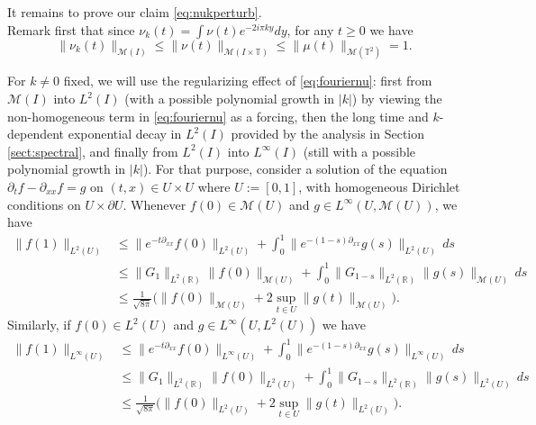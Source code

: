\documentclass[12pt]{article}
\newcommand{\R}{\mathbb{R}}
\newcommand{\T}{\mathbb{T}}
\begin{document}
\smallskip

It remains to prove our claim \eqref{eq:nukperturb}.\\
Remark first that since $\nu_k(t) = \int \nu(t) e^{-2i\pi ky}dy$, for any 
$t\geq 0$ we have 
\begin{equation}\label{eq:firstboundnu}
\|\nu_k(t)\|_{\mathcal{M}(I)} \leq \|\nu(t)\|_{\mathcal{M}(I \times \T)} \leq
\|\mu(t)\|_{\mathcal{M}(\T^2)} = 1.  
\end{equation}

For $k \neq 0$ fixed, we will use the regularizing effect of
\eqref{eq:fouriernu}: first from $\mathcal{M}(I)$ into $L^2(I)$ 
(with a possible polynomial growth in $|k|$) by viewing the non-homogeneous
term in \eqref{eq:fouriernu} as a forcing, then the long time
and $k$-dependent exponential decay in $L^2(I)$ provided by the 
analysis in Section \ref{sect:spectral}, and finally from $L^2(I)$ 
into $L^\infty(I)$ (still with a possible polynomial growth in $|k|$). 
For that purpose, consider a solution of the equation 
$\partial_t f - \partial_{xx} f = g$ on $(t,x) \in U \times U$  where $U :=
[0,1]$, with homogeneous Dirichlet conditions on $U \times \partial U$. Whenever
$f(0) \in \mathcal{M}(U)$ and $g \in L^\infty(U, \mathcal{M}(U))$, 
we have
\begin{equation}\label{eq:regu1}\begin{split}
\|f(1)\|_{L^2(U)} &\leq \|e^{-t\partial_{xx}}f(0)\|_{L^2(U)} + \int_0^1 
\|e^{-(1-s)\partial_{xx}}g(s)\|_{L^2(U)}\, ds\\
&\leq \|G_1\|_{L^2(\R)}\|f(0)\|_{\mathcal{M}(U)} + \int_0^1
\|G_{1-s}\|_{L^2(\R)}\|g(s)\|_{\mathcal{M}(U)}\, ds\\
&\leq \frac{1}{\sqrt{8\pi }}\Big( \|f(0)\|_{\mathcal{M}(U)} + 2 \sup_{t \in
U}\|g(t)\|_{\mathcal{M}(U)}\Big).
\end{split}\end{equation}
Similarly, if $f(0) \in L^2(U)$ and $g \in L^\infty(U, L^2(U))$
we have
\begin{equation}\label{eq:regu2}\begin{split}
\|f(1)\|_{L^\infty(U)} &\leq \|e^{-t\partial_{xx}}f(0)\|_{L^\infty(U)} + \int_0^1 
\|e^{-(1-s)\partial_{xx}}g(s)\|_{L^\infty(U)}\, ds\\
&\leq \|G_1\|_{L^2(\R)}\|f(0)\|_{L^2(U)} + \int_0^1
\|G_{1-s}\|_{L^2(\R)}\|g(s)\|_{L^2(U)}\, ds\\
&\leq \frac{1}{\sqrt{8\pi }}\Big( \|f(0)\|_{L^2(U)} + 2 \sup_{t \in
U}\|g(t)\|_{L^2(U)}\Big).
\end{split}\end{equation}
\end{document}
